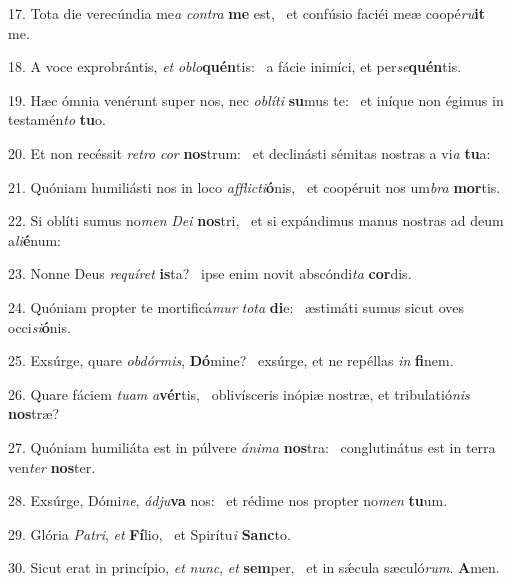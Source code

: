 17. Tota die verecúndia me\textit{a} \textit{con}\textit{tra} \textbf{me} est, \ast\  et confúsio faciéi meæ coopé\textit{ru}\textbf{it} me.\

18. A voce exprobrántis, \textit{et} \textit{ob}\textit{lo}\textbf{quén}tis: \ast\  a fácie inimíci, et per\textit{se}\textbf{quén}tis.\

19. Hæc ómnia venérunt super nos, nec \textit{ob}\textit{lí}\textit{ti} \textbf{su}mus te: \ast\  et iníque non égimus in testamén\textit{to} \textbf{tu}o.\

20. Et non recéssit \textit{re}\textit{tro} \textit{cor} \textbf{nos}trum: \ast\  et declinásti sémitas nostras a vi\textit{a} \textbf{tu}a:\

21. Quóniam humiliásti nos in loco \textit{af}\textit{flic}\textit{ti}\textbf{ó}nis, \ast\  et coopéruit nos um\textit{bra} \textbf{mor}tis.\

22. Si oblíti sumus no\textit{men} \textit{De}\textit{i} \textbf{nos}tri, \ast\  et si expándimus manus nostras ad deum a\textit{li}\textbf{é}num:\

23. Nonne Deus \textit{re}\textit{quí}\textit{ret} \textbf{is}ta? \ast\  ipse enim novit abscóndi\textit{ta} \textbf{cor}dis.\

24. Quóniam propter te mortificá\textit{mur} \textit{to}\textit{ta} \textbf{di}e: \ast\  æstimáti sumus sicut oves occi\textit{si}\textbf{ó}nis.\

25. Exsúrge, quare \textit{ob}\textit{dór}\textit{mis}, \textbf{Dó}mine? \ast\  exsúrge, et ne repéllas \textit{in} \textbf{fi}nem.\

26. Quare fáciem \textit{tu}\textit{am} \textit{a}\textbf{vér}tis, \ast\  oblivísceris inópiæ nostræ, et tribulatió\textit{nis} \textbf{nos}træ?\

27. Quóniam humiliáta est in púlvere \textit{á}\textit{ni}\textit{ma} \textbf{nos}tra: \ast\  conglutinátus est in terra ven\textit{ter} \textbf{nos}ter.\

28. Exsúrge, Dómi\textit{ne}, \textit{ád}\textit{ju}\textbf{va} nos: \ast\  et rédime nos propter no\textit{men} \textbf{tu}um.\

29. Glória \textit{Pa}\textit{tri}, \textit{et} \textbf{Fí}lio, \ast\  et Spirítu\textit{i} \textbf{Sanc}to.\

30. Sicut erat in princípio, \textit{et} \textit{nunc}, \textit{et} \textbf{sem}per, \ast\  et in sǽcula sæculó\textit{rum}. \textbf{A}men.\

